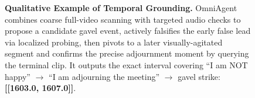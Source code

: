 \documentclass{article}
\theoremstyle{plain}
\theoremstyle{definition}
\theoremstyle{remark}
\begin{document}
\begin{figure}[!ht]
\begin{minipage}{0.95\textwidth}
    \end{minipage}

    \caption{\textbf{Qualitative Example of Temporal Grounding.} OmniAgent combines coarse full-video scanning with targeted audio checks to propose a candidate gavel event, actively falsifies the early false lead via localized probing, then pivots to a later visually-agitated segment and confirms the precise adjournment moment by querying the terminal clip. It outputs the exact interval covering ``I am NOT happy'' $\to$ ``I am adjourning the meeting'' $\to$ gavel strike: \textbf{[[1603.0, 1607.0]]}.}
    \label{fig:qual_tr}
\end{figure}
\end{document}
